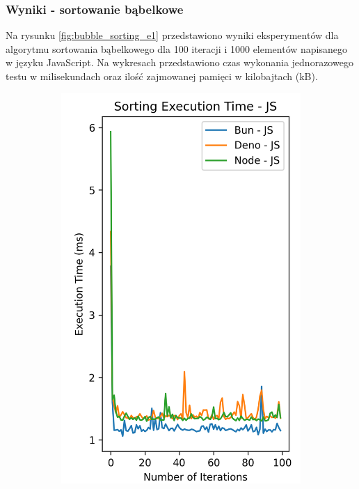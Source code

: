 \subsubsection{Wyniki - sortowanie bąbelkowe}
Na rysunku \ref{fig:bubble_sorting_e1} przedstawiono wyniki eksperymentów dla algorytmu sortowania bąbelkowego dla 100 iteracji i 1000 elementów napisanego w języku JavaScript. Na wykresach przedstawiono czas wykonania jednorazowego testu w milisekundach oraz ilość zajmowanej pamięci w kilobajtach (kB).

\begin{figure}[H]
  \centering
  \begin{subfigure}[b]{0.44\textwidth}
    \centering
    \includegraphics[width=\textwidth]{Figures/sorting/sorting_bubble_100_1000_js_time.png}

\end{subfigure}
\end{figure}
